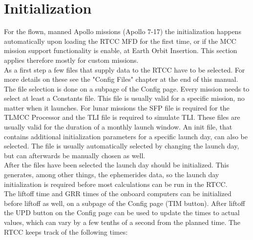 \documentclass[11pt]{article} %
\begin{document}
\section{Initialization}
For the flown, manned Apollo missions (Apollo 7-17) the initialization happens automatically upon loading the RTCC MFD for the first time, or if the MCC mission support functionality is enable, at Earth Orbit Insertion. This section applies therefore mostly for custom missions.\\
As a first step a few files that supply data to the RTCC have to be selected. For more details on these see the "Config Files" chapter at the end of this manual. The file selection is done on a subpage of the Config page. Every mission needs to select at least a Constants file. This file is usually valid for a specific mission, no matter when it launches. For lunar missions the SFP file is required for the TLMCC Processor and the TLI file is required to simulate TLI. These files are usually valid for the duration of a monthly launch window. An init file, that contains additional initialization parameters for a specific launch day, can also be selected. The file is usually automatically selected by changing the launch day, but can afterwards be manually chosen as well.\\
After the files have been selected the launch day should be initialized. This generates, among other things, the ephemerides data, so the launch day initialization is required before most calculations can be run in the RTCC.\\
The liftoff time and GRR times of the onboard computers can be initialized before liftoff as well, on a subpage of the Config page (TIM button). After liftoff the UPD button on the Config page can be used to update the times to actual values, which can vary by a few tenths of a second from the planned time. The RTCC keeps track of the following times:\\
\end{document}
